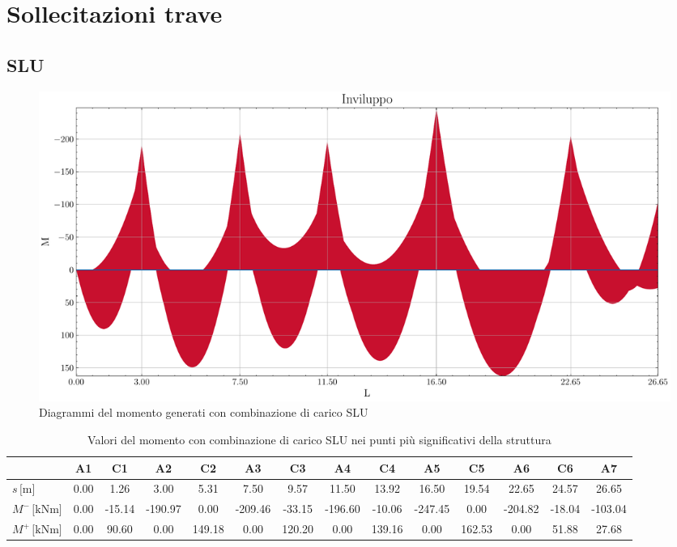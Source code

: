 \clearpage
\section{Sollecitazioni trave}
\begin{landscape}
\subsection{SLU}
\begin{figure}[H]
\centering
\includegraphics[height=0.6\textwidth]{IMG/diagrammi_trave/ULS_M.pdf}
\caption{Diagrammi del momento generati con combinazione di carico SLU}
\label{fig:trave_ULS_momento}
\end{figure}
\begin{table}[H]
\footnotesize
\centering
\caption{Valori del momento con combinazione di carico SLU nei punti più significativi della struttura}
\label{tab:trave_ULS_momento}
	\begin{tabular}{lS[table-format=-3.2]S[table-format=-3.2]S[table-format=-3.2]S[table-format=-3.2]S[table-format=-3.2]S[table-format=-3.2]S[table-format=-3.2]S[table-format=-3.2]S[table-format=-3.2]S[table-format=-3.2]S[table-format=-3.2]S[table-format=-3.2]S[table-format=-3.2]}
		\toprule
		{} & {A1} & {C1} & {A2} & {C2} & {A3} & {C3} & {A4} & {C4} & {A5} & {C5} & {A6} & {C6} & {A7} \\
		\midrule
		$s\,\si{[\metre]}$ & 0.00 & 1.26 & 3.00 & 5.31 & 7.50 & 9.57 & 11.50 & 13.92 & 16.50 & 19.54 & 22.65 & 24.57 & 26.65 \\
        $M^{-}\,\si{[\kilo\newton\metre]}$ & 0.00 & -15.14 & -190.97 & 0.00 & -209.46 & -33.15 & -196.60 & -10.06 & -247.45 & 0.00 & -204.82 & -18.04 & -103.04 \\
        $M^{+}\,\si{[\kilo\newton\metre]}$ & 0.00 & 90.60 & 0.00 & 149.18 & 0.00 & 120.20 & 0.00 & 139.16 & 0.00 & 162.53 & 0.00 & 51.88 & 27.68 \\

\end{tabular}
\end{table}
\end{landscape}
